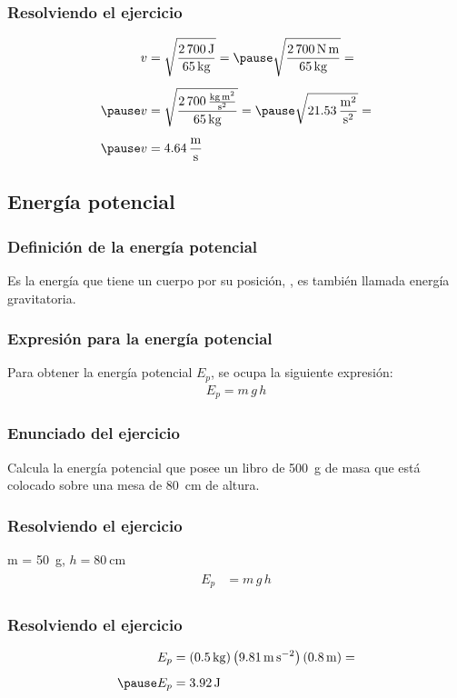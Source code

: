 \documentclass[14pt]{beamer}
\begin{document}
\begin{frame}
\frametitle{Resolviendo el ejercicio}
\pause
\begin{eqnarray*}
\begin{aligned}
v &= \sqrt{\dfrac{2 \, \SI{700}{\joule}}{\SI{65}{\kilo\gram}}} = \pause \sqrt{\dfrac{2 \, \SI{700}{\newton\meter}}{\SI{65}{\kilo\gram}}} = \\[0.5em]\pause 
v &= \sqrt{\dfrac{2 \, \SI[per-mode=fraction]{700}{\kilo\gram\square\meter\per\square\second}}{\SI{65}{\kilo\gram}}} = \pause \sqrt{\SI[per-mode=fraction]{21.53}{\square\meter\per\square\second}} = \\[0.5em] \pause
v &= \SI[per-mode=fraction]{4.64}{\meter\per\second}
\end{aligned}
\end{eqnarray*}
\end{frame}    

\subsection{Energía potencial}

\begin{frame}
\frametitle{Definición de la energía potencial}
Es la energía que tiene un cuerpo por su posición, , es también llamada energía gravitatoria.
\end{frame}
\begin{frame}
\frametitle{Expresión para la energía potencial}
Para obtener la energía potencial $E_{p}$, se ocupa la siguiente expresión:
\pause
\begin{align*}
E_{p} = m \, g \, h
\end{align*}
\end{frame}
\begin{frame}
\frametitle{Enunciado del ejercicio}
Calcula la energía potencial que posee un libro de \SI{500}{\gram} de masa que está colocado sobre una mesa de \SI{80}{\centi\meter} de altura.
\end{frame}
\begin{frame}
\frametitle{Resolviendo el ejercicio}
 \pause m = \SI{50}{\gram}, \pause $h = \SI{80}{\centi\meter}$
\\
\bigskip
\pause
{}
\begin{eqnarray*}
\begin{aligned}
E_{p} &= m \, g \, h
\end{aligned}
\end{eqnarray*}
\end{frame}
\begin{frame}
\frametitle{Resolviendo el ejercicio}
\pause
\begin{eqnarray*}
\begin{aligned}
E_{p} &= (\SI{0.5}{\kilo\gram}) \left( \SI{9.81}{\meter\per\square\second} \right) (\SI{0.8}{\meter}) = \\[0.5em] \pause
E_{p} &= \SI{3.92}{\joule}
\end{aligned}
\end{eqnarray*}
\end{frame}
    
\end{document}
